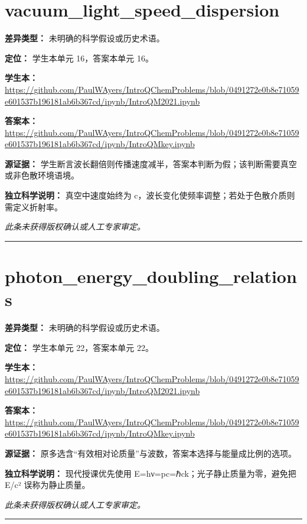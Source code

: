 \documentclass[UTF8,11pt,oneside,openany,fontset=none]{ctexbook}
\begin{document}
\section{vacuum\_light\_speed\_dispersion}
\noindent\textbf{差异类型：} 未明确的科学假设或历史术语。\par
\noindent\textbf{定位：} 学生本单元 16，答案本单元 16。\par
\noindent\textbf{学生本：} \url{https://github.com/PaulWAyers/IntroQChemProblems/blob/0491272e0b8e71059e601537b196181ab6b367cd/ipynb/IntroQM2021.ipynb}\par
\noindent\textbf{答案本：} \url{https://github.com/PaulWAyers/IntroQChemProblems/blob/0491272e0b8e71059e601537b196181ab6b367cd/ipynb/IntroQMkey.ipynb}\par
\noindent\textbf{源证据：} 学生断言波长翻倍则传播速度减半，答案本判断为假；该判断需要真空或非色散环境语境。\par
\noindent\textbf{独立科学说明：} 真空中速度始终为 c，波长变化使频率调整；若处于色散介质则需定义折射率。\par
\medskip\noindent\textit{此条未获得版权确认或人工专家审定。}
\medskip\hrule\medskip
\section{photon\_energy\_doubling\_relations}
\noindent\textbf{差异类型：} 未明确的科学假设或历史术语。\par
\noindent\textbf{定位：} 学生本单元 22，答案本单元 22。\par
\noindent\textbf{学生本：} \url{https://github.com/PaulWAyers/IntroQChemProblems/blob/0491272e0b8e71059e601537b196181ab6b367cd/ipynb/IntroQM2021.ipynb}\par
\noindent\textbf{答案本：} \url{https://github.com/PaulWAyers/IntroQChemProblems/blob/0491272e0b8e71059e601537b196181ab6b367cd/ipynb/IntroQMkey.ipynb}\par
\noindent\textbf{源证据：} 原多选含“有效相对论质量”与波数，答案本选择与能量成比例的选项。\par
\noindent\textbf{独立科学说明：} 现代授课优先使用 E=hν=pc=ℏck；光子静止质量为零，避免把 E/c² 误称为静止质量。\par
\medskip\noindent\textit{此条未获得版权确认或人工专家审定。}
\medskip\hrule\medskip
\end{document}
